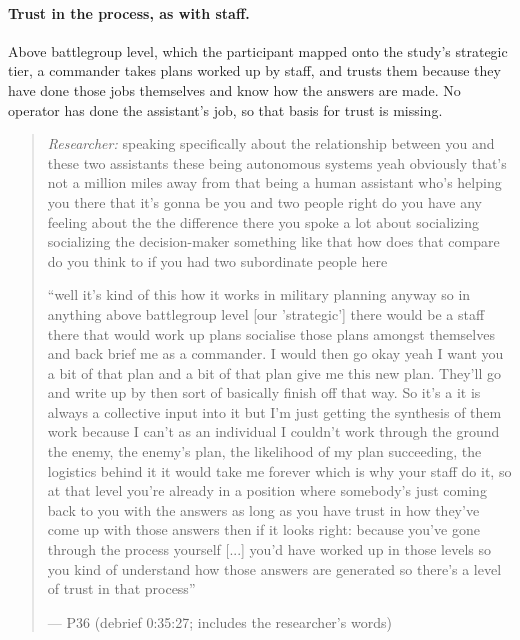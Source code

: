 
\label{sec:qual:practitioner:pt-staff-process}\paragraph{Trust in the process, as with staff.}
Above battlegroup level, which the participant mapped onto the study's strategic tier, a commander takes plans worked up by staff, and trusts them because they have done those jobs themselves and know how the answers are made. No operator has done the assistant's job, so that basis for trust is missing.

\begin{quote}\small
{\footnotesize\textit{Researcher:} speaking specifically about the relationship between you and these two assistants these being autonomous systems yeah obviously that's not a million miles away from that being a human assistant who's helping you there that it's gonna be you and two people right do you have any feeling about the the difference there you spoke a lot about socializing socializing the decision-maker something like that how does that compare do you think to if you had two subordinate people here}\par\smallskip
``well it's kind of this how it works in military planning anyway so in anything above battlegroup level [our 'strategic'] there would be a staff there that would work up plans socialise those plans amongst themselves and back brief me as a commander. I would then go okay yeah I want you a bit of that plan and a bit of that plan give me this new plan. They'll go and write up by then sort of basically finish off that way. So it's a it is always a collective input into it but I'm just getting the synthesis of them work because I can't as an individual I couldn't work through the ground the enemy, the enemy's plan, the likelihood of my plan succeeding, the logistics behind it it would take me forever which is why your staff do it, so at that level you're already in a position where somebody's just coming back to you with the answers as long as you have trust in how they've come up with those answers then if it looks right: because you've gone through the process yourself [...] you'd have worked up in those levels so you kind of understand how those answers are generated so there's a level of trust in that process''\par\hfill--- P36 (debrief 0:35:27; includes the researcher's words)
\end{quote}

